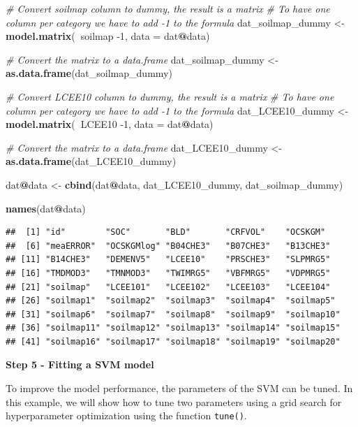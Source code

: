 \documentclass[10pt,b5paper,]{book}
\newenvironment{Shaded}{\begin{snugshade}}{\end{snugshade}}
\newcommand{\CommentTok}[1]{\textcolor[rgb]{0.56,0.35,0.01}{\textit{#1}}}
\newcommand{\DataTypeTok}[1]{\textcolor[rgb]{0.13,0.29,0.53}{#1}}
\newcommand{\DecValTok}[1]{\textcolor[rgb]{0.00,0.00,0.81}{#1}}
\newcommand{\KeywordTok}[1]{\textcolor[rgb]{0.13,0.29,0.53}{\textbf{#1}}}
\newcommand{\NormalTok}[1]{#1}
\newcommand{\OperatorTok}[1]{\textcolor[rgb]{0.81,0.36,0.00}{\textbf{#1}}}
\newcommand{\StringTok}[1]{\textcolor[rgb]{0.31,0.60,0.02}{#1}}
\theoremstyle{definition}
\theoremstyle{definition}
\theoremstyle{definition}
\theoremstyle{remark}
\begin{document}
\begin{Shaded}
\begin{Highlighting}[]
\CommentTok{# Convert soilmap column to dummy, the result is a matrix}
\CommentTok{# To have one column per category we have to add -1 to the formula}
\NormalTok{dat_soilmap_dummy <-}\StringTok{ }\KeywordTok{model.matrix}\NormalTok{(}\OperatorTok{~}\NormalTok{soilmap }\DecValTok{-1}\NormalTok{, }\DataTypeTok{data =}\NormalTok{ dat}\OperatorTok{@}\NormalTok{data)}

\CommentTok{# Convert the matrix to a data.frame}
\NormalTok{dat_soilmap_dummy <-}\StringTok{ }\KeywordTok{as.data.frame}\NormalTok{(dat_soilmap_dummy)}

\CommentTok{# Convert LCEE10 column to dummy, the result is a matrix}
\CommentTok{# To have one column per category we have to add -1 to the formula}
\NormalTok{dat_LCEE10_dummy <-}\StringTok{ }\KeywordTok{model.matrix}\NormalTok{(}\OperatorTok{~}\NormalTok{LCEE10 }\DecValTok{-1}\NormalTok{, }\DataTypeTok{data =}\NormalTok{ dat}\OperatorTok{@}\NormalTok{data)}

\CommentTok{# Convert the matrix to a data.frame}
\NormalTok{dat_LCEE10_dummy <-}\StringTok{ }\KeywordTok{as.data.frame}\NormalTok{(dat_LCEE10_dummy)}

\NormalTok{dat}\OperatorTok{@}\NormalTok{data <-}\StringTok{ }\KeywordTok{cbind}\NormalTok{(dat}\OperatorTok{@}\NormalTok{data, dat_LCEE10_dummy, dat_soilmap_dummy)}

\KeywordTok{names}\NormalTok{(dat}\OperatorTok{@}\NormalTok{data)}
\end{Highlighting}
\end{Shaded}

\begin{verbatim}
##  [1] "id"        "SOC"       "BLD"       "CRFVOL"    "OCSKGM"   
##  [6] "meaERROR"  "OCSKGMlog" "B04CHE3"   "B07CHE3"   "B13CHE3"  
## [11] "B14CHE3"   "DEMENV5"   "LCEE10"    "PRSCHE3"   "SLPMRG5"  
## [16] "TMDMOD3"   "TMNMOD3"   "TWIMRG5"   "VBFMRG5"   "VDPMRG5"  
## [21] "soilmap"   "LCEE101"   "LCEE102"   "LCEE103"   "LCEE104"  
## [26] "soilmap1"  "soilmap2"  "soilmap3"  "soilmap4"  "soilmap5" 
## [31] "soilmap6"  "soilmap7"  "soilmap8"  "soilmap9"  "soilmap10"
## [36] "soilmap11" "soilmap12" "soilmap13" "soilmap14" "soilmap15"
## [41] "soilmap16" "soilmap17" "soilmap18" "soilmap19" "soilmap20"
\end{verbatim}

\textbf{Step 5 - Fitting a SVM model}

To improve the model performance, the parameters of the SVM can be
tuned. In this example, we will show how to tune two parameters using a
grid search for hyperparameter optimization using the function
\texttt{tune()}.
\end{document}
